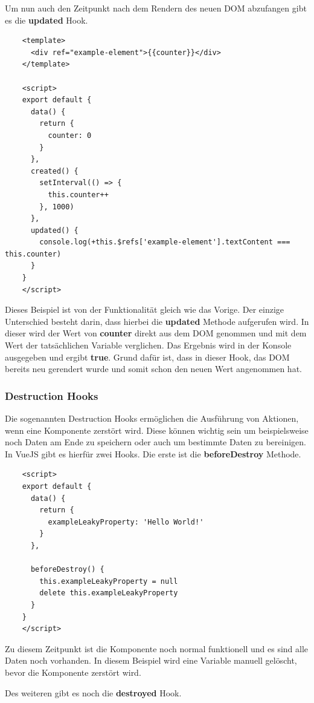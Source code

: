 Um nun auch den Zeitpunkt nach dem Rendern des neuen DOM abzufangen gibt es die \textbf{updated} Hook.

\begin{lstlisting}
    <template>
      <div ref="example-element">{{counter}}</div>
    </template>
    
    <script>
    export default {
      data() {
        return {
          counter: 0
        }
      },
      created() {
        setInterval(() => {
          this.counter++
        }, 1000)
      },
      updated() {
        console.log(+this.$refs['example-element'].textContent === this.counter)
      }
    }
    </script>
\end{lstlisting}

Dieses Beispiel ist von der Funktionalität gleich wie das Vorige. Der einzige Unterschied besteht darin, dass hierbei die \textbf{updated} Methode aufgerufen wird. In dieser wird der Wert von \textbf{counter} direkt aus dem DOM genommen und mit dem Wert der tatsächlichen Variable verglichen. Das Ergebnis wird in der Konsole ausgegeben und ergibt \textbf{true}. Grund dafür ist, dass in dieser Hook, das DOM bereits neu gerendert wurde und somit schon den neuen Wert angenommen hat.
\cite{frontend_web_vuejs_lifecycle}
\newpage

\subsubsection{Destruction Hooks}
Die sogenannten Destruction Hooks ermöglichen die Ausführung von Aktionen, wenn eine Komponente zerstört wird. Diese können wichtig sein um beispielsweise noch Daten am Ende zu speichern oder auch um bestimmte Daten zu bereinigen.
In VueJS gibt es hierfür zwei Hooks. Die erste ist die \textbf{beforeDestroy} Methode.

\begin{lstlisting}
    <script>
    export default {
      data() {
        return {
          exampleLeakyProperty: 'Hello World!'
        }
      },
    
      beforeDestroy() {
        this.exampleLeakyProperty = null
        delete this.exampleLeakyProperty
      }
    }
    </script>
\end{lstlisting}

Zu diesem Zeitpunkt ist die Komponente noch normal funktionell und es sind alle Daten noch vorhanden. In diesem Beispiel wird eine Variable manuell gelöscht, bevor die Komponente zerstört wird.

Des weiteren gibt es noch die \textbf{destroyed} Hook.

